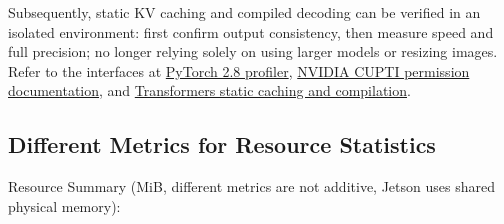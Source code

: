 Subsequently, static KV caching and compiled decoding can be verified in an isolated environment: first confirm output consistency, then measure speed and full precision; no longer relying solely on using larger models or resizing images. Refer to the interfaces at \href{https://docs.pytorch.org/docs/2.8/profiler.html}{PyTorch 2.8 profiler}, \href{https://developer.nvidia.com/nvidia-development-tools-solutions-err-nvgpuctrperm-cupti}{NVIDIA CUPTI permission documentation}, and \href{https://huggingface.co/docs/transformers/v4.57.1/en/llm_optims}{Transformers static caching and compilation}.


\subsection{Different Metrics for Resource Statistics}\label{s24-detail-4}

Resource Summary (MiB, different metrics are not additive, Jetson uses shared physical memory):

